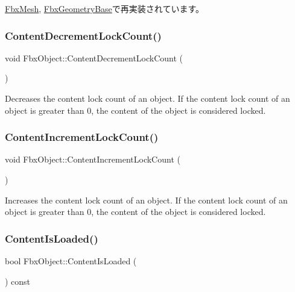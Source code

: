 \hyperlink{class_fbx_mesh_aacd77ff7908d897c73983919c4aade72}{Fbx\+Mesh}, \hyperlink{class_fbx_geometry_base_acf13ddd2717d2f1ca4dc57b5ea0801b1}{Fbx\+Geometry\+Base}で再実装されています。

\mbox{\label{class_fbx_object_a7720b36c508a8c32c9cf72a7a59f5c3e}} 
\subsubsection{\texorpdfstring{Content\+Decrement\+Lock\+Count()}{ContentDecrementLockCount()}}
{\footnotesize\ttfamily void Fbx\+Object\+::\+Content\+Decrement\+Lock\+Count (\begin{DoxyParamCaption}{ }\end{DoxyParamCaption})}

Decreases the content lock count of an object. If the content lock count of an object is greater than 0, the content of the object is considered locked. \mbox{\label{class_fbx_object_a83ebb7c4a09328e517a4b5367fcf8c0d}} 
\subsubsection{\texorpdfstring{Content\+Increment\+Lock\+Count()}{ContentIncrementLockCount()}}
{\footnotesize\ttfamily void Fbx\+Object\+::\+Content\+Increment\+Lock\+Count (\begin{DoxyParamCaption}{ }\end{DoxyParamCaption})}

Increases the content lock count of an object. If the content lock count of an object is greater than 0, the content of the object is considered locked. \mbox{\label{class_fbx_object_ac1e5a81afa5c74aec67c57136b541161}} 
\subsubsection{\texorpdfstring{Content\+Is\+Loaded()}{ContentIsLoaded()}}
{\footnotesize\ttfamily bool Fbx\+Object\+::\+Content\+Is\+Loaded (\begin{DoxyParamCaption}{ }\end{DoxyParamCaption}) const}

